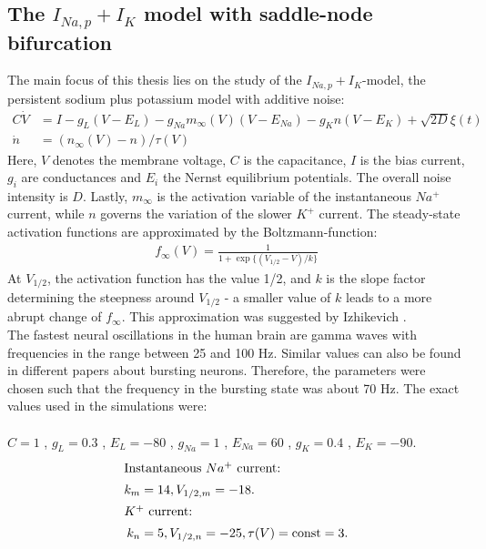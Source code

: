 \documentclass[12pt,a4paper]{article}
\begin{document}
\subsection{The $I_{Na,p}+I_K$ model with saddle-node bifurcation}
The main focus of this thesis lies on the study of the $I_{Na,p}+I_K$-model, the persistent sodium plus potassium model with additive noise:
\begin{align}\label{Veq}
C\dot{V} &= I - g_L(V-E_L) - g_{Na}m_{\infty}(V)(V-E_{Na}) - g_Kn(V-E_K)+\sqrt{2D}\xi(t)\\\label{neq}
\dot{n} &= (n_{\infty}(V)-n)/\tau(V)
\end{align}
Here, $V$ denotes the membrane voltage, $C$ is the capacitance, $I$ is the bias current, $g_i$ are conductances and $E_i$ the Nernst equilibrium potentials. The overall noise intensity is $D$. Lastly, $m_{\infty}$ is the activation variable of the instantaneous $Na^+$ current, while $n$ governs the variation of the slower $K^+$ current. The steady-state activation functions are approximated by the Boltzmann-function:
\begin{align*}
f_{\infty}(V) = \frac{1}{1+\exp\{(V_{1/2}-V)/k\}}
\end{align*}
At $V_{1/2}$, the activation function has the value 1/2, and $k$ is the slope factor determining the steepness around $V_{1/2}$ - a smaller value of $k$ leads to a more abrupt change of $f_{\infty}$. This approximation was suggested by Izhikevich \cite{izi}.\\
The fastest neural oscillations in the human brain are gamma waves with frequencies in the range between 25 and 100 Hz\cite{gamma}\cite{gamma2}. Similar values can also be found in different papers about bursting neurons\cite{burstneu}\cite{burstneu2}. Therefore, the parameters were chosen such that the frequency in the bursting state was about 70 Hz.
The exact values used in the simulations were:\\\\
$C=1$ , $g_L=0.3$ , $E_L=-80$ , $g_{Na}=1$ , $E_{Na}=60$ , $g_K=0.4$ , $E_K=-90$.
\begin{align*}
\intertext{Instantaneous $Na^+$ current:} k_m&=14 , V_{1/2,m}=-18. 
\\
\intertext{$K^+$ current:} k_n&=5 , V_{1/2,n}=-25 , \tau(V)=\text{const}=3.
\end{align*}
\end{document}
